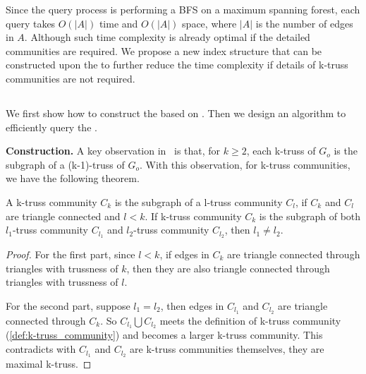 Since the query process is performing a BFS on a maximum spanning forest, each query takes $O(|A|)$ time and $O(|A|)$ space, where $|A|$ is the number of edges in $A$. Although such time complexity is already optimal if the detailed communities are required. We propose a new index structure that can be constructed upon the \inducedgraph{} to further reduce the time complexity if details of k-truss communities are not required.

\subsection{\TreeIndex{}}

We first show how to construct the \treeindex{} based on \inducedgraph{}. Then we design an algorithm to efficiently query the \treeindex{}. 

\vskip 0.1in \noindent \textbf{\TreeIndex{} Construction.} A key observation in~\cite{cohen2008trusses} is that, for $k \ge 2$, each k-truss of $G_o$ is the subgraph of a (k-1)-truss of $G_o$. With this observation, for k-truss communities, we have the following theorem.

\begin{Thm}
A k-truss community $C_k$ is the subgraph of a l-truss community $C_l$, if $C_k$ and $C_l$ are triangle connected and $l < k$. If k-truss community $C_k$ is the subgraph of both $l_1$-truss community $C_{l_1}$ and $l_2$-truss community $C_{l_2}$, then $l_1 \neq l_2$.
\label{thm:truss_hierarchy}
\end{Thm}

\begin{proof}
For the first part, since $l < k$, if edges in $C_k$ are triangle connected through triangles with trussness of $k$, then they are also triangle connected through triangles with trussness of $l$. 

For the second part, suppose $l_1 = l_2$, then edges in $C_{l_1}$ and $C_{l_2}$ are triangle connected through $C_k$. So $C_{l_1} \bigcup C_{l_2}$ meets the definition of k-truss community (\autoref{def:k-truss_community}) and becomes a larger k-truss community. This contradicts with $C_{l_1}$ and $C_{l_2}$ are k-truss communities themselves, \ie they are maximal k-truss.
\end{proof}


